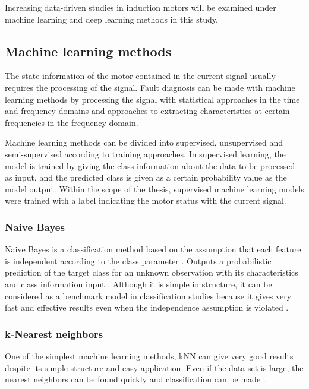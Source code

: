 Increasing data-driven studies in induction motors will be examined under machine learning and deep learning methods in this study. 

\subsection{Machine learning methods}

The state information of the motor contained in the current signal usually requires the processing of the signal. Fault diagnosis can be made with machine learning methods by processing the signal with statistical approaches in the time and frequency domains and approaches to extracting characteristics at certain frequencies in the frequency domain. 

Machine learning methods can be divided into supervised, unsupervised and semi-supervised according to training approaches. In supervised learning, the model is trained by giving the class information about the data to be processed as input, and the predicted class is given as a certain probability value as the model output. Within the scope of the thesis, supervised machine learning models were trained with a label indicating the motor status with the current signal.

\subsubsection{Naive Bayes}

Naive Bayes is a classification method based on the assumption that each feature is independent according to the class parameter \cite{friedman1997bayesian}. Outputs a probabilistic prediction of the target class for an unknown observation with its characteristics and class information input \cite{lowd2005naive}. Although it is simple in structure, it can be considered as a benchmark model in classification studies because it gives very fast and effective results even when the independence assumption is violated \cite{martin2018experimental}. 

\subsubsection{k-Nearest neighbors}

One of the simplest machine learning methods, kNN can give very good results despite its simple structure and easy application. Even if the data set is large, the nearest neighbors can be found quickly and classification can be made \cite{shalev2014understanding}.

